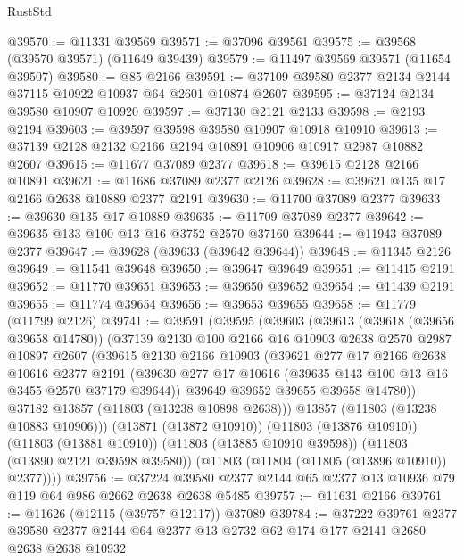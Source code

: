 \begin{lexlean}{RustStd}
\begin{coremodule}
@39570 := @11331 @39569
@39571 := @37096 @39561
@39575 := @39568 (@39570 @39571) (@11649 @39439)
@39579 := @11497 @39569 @39571 (@11654 @39507)
@39580 := @85 @2166
@39591 := @37109 @39580 @2377 @2134 @2144 @37115 @10922 @10937 @64 @2601 @10874 @2607
@39595 := @37124 @2134 @39580 @10907 @10920
@39597 := @37130 @2121 @2133
@39598 := @2193 @2194
@39603 := @39597 @39598 @39580 @10907 @10918 @10910
@39613 := @37139 @2128 @2132 @2166 @2194 @10891 @10906 @10917 @2987 @10882 @2607
@39615 := @11677 @37089 @2377
@39618 := @39615 @2128 @2166 @10891
@39621 := @11686 @37089 @2377 @2126
@39628 := @39621 @135 @17 @2166 @2638 @10889 @2377 @2191
@39630 := @11700 @37089 @2377
@39633 := @39630 @135 @17 @10889
@39635 := @11709 @37089 @2377
@39642 := @39635 @133 @100 @13 @16 @3752 @2570 @37160
@39644 := @11943 @37089 @2377
@39647 := @39628 (@39633 (@39642 @39644))
@39648 := @11345 @2126
@39649 := @11541 @39648
@39650 := @39647 @39649
@39651 := @11415 @2191
@39652 := @11770 @39651
@39653 := @39650 @39652
@39654 := @11439 @2191
@39655 := @11774 @39654
@39656 := @39653 @39655
@39658 := @11779 (@11799 @2126)
@39741 := @39591
    (@39595
      (@39603
        (@39613
          (@39618 (@39656 @39658 @14780))
          (@37139
            @2130
            @100
            @2166
            @16
            @10903
            @2638
            @2570
            @2987
            @10897
            @2607
            (@39615
              @2130
              @2166
              @10903
              (@39621
                @277
                @17
                @2166
                @2638
                @10616
                @2377
                @2191
                (@39630 @277 @17 @10616 (@39635 @143 @100 @13 @16 @3455 @2570 @37179 @39644))
                @39649
                @39652
                @39655
                @39658
                @14780))
            @37182
            @13857
            (@11803 (@13238 @10898 @2638)))
          @13857
          (@11803 (@13238 @10883 @10906)))
        (@13871 (@13872 @10910))
        (@11803 (@13876 @10910))
        (@11803 (@13881 @10910))
        (@11803 (@13885 @10910 @39598))
        (@11803 (@13890 @2121 @39598 @39580))
        (@11803 (@11804 (@11805 (@13896 @10910)) @2377))))
@39756 := @37224 @39580 @2377 @2144 @65 @2377 @13 @10936 @79 @119 @64 @986 @2662 @2638 @2638 @5485
@39757 := @11631 @2166
@39761 := @11626 (@12115 (@39757 @12117)) @37089
@39784 := @37222
    @39761
    @2377
    @39580
    @2377
    @2144
    @64
    @2377
    @13
    @2732
    @62
    @174
    @177
    @2141
    @2680
    @2638
    @2638
    @10932

\end{coremodule}
\end{lexlean}
